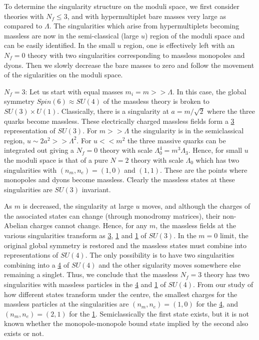 To determine the singularity structure on the moduli space, we first
consider theories with $N_f \leq 3$, and with hypermultiplet bare
masses very large as compared to $\Lambda$. The singularities which
arise from hypermultiplets becoming massless are now in the
semi-classical (large $u$) region of the moduli space and can be easily
identified. In the small $u$ region, one is effectively left with an
$N_f=0$ theory with two singularities corresponding to massless
monopoles and dyons. Then we slowly decrease the bare masses to zero
and follow the movement of the sigularities on the moduli space.

\noindent\underline{$N_f = 3$}:
Let us start with equal masses $m_i = m >> \Lambda$. In this case, the
global symmetry $Spin(6)\approx SU(4)$ of the massless theory is
broken to $SU(3) \times U(1)$. Classically, there is a singularity at
$a = m/ \sqrt{2}$ where the three quarks become massless. These
electrically charged massless fields form a \underline{3}
representation of $SU(3)$. For $m >> \Lambda$ the singularity is in
the semiclassical region, $u \sim 2a^2 >> \Lambda^2$. For $u<< m^2$
the three massive quarks can be integrated out giving a $N_f=0$ theory
with scale $\Lambda^{4}_{0} = m^3 \Lambda_3$. Hence, for small $u$ the
moduli space is that of a pure $N = 2$ theory with scale $\Lambda_{0}$
which has two singularities with $(n_m , n_e) = (1,0)$ and
$(1,1)$. These are the points where monopoles and dyons become
massless. Clearly the massless states at these singularities are
$SU(3)$ invariant. 

As $m$ is decreased, the singularity at large $u$ moves, and although
the charges of the associated states can change (through monodromy
matrices), their non-Abelian charges cannot change. Hence, for any
$m$, the massless fields at the various singularities transform as
\underline{3}, \underline{1} and \underline{1} of $SU(3)$. In the $m =
0$ limit, the original global symmetry is restored and the massless
states must combine into representations of $SU(4)$. The only
possibility is to have two singularities combining into a
\underline{4} of $SU(4)$ and the other sigularity moves somewhere else
remaining a singlet. Thus, we conclude that the massless $N_f = 3$
theory has two singularities with massless particles in the
\underline{4} and \underline{1} of $SU(4)$. From our study of how
different states transform under the centre, the smallest charges for
the massless particles at the singularities are $(n_m , n_e) = (1,0)$
for the \underline{4}, and $(n_m, n_e) = (2,1)$ for the \underline{1}.
Semiclassically the first state exists, but it is not known whether
the monopole-monopole bound state implied by the second also exists or
not.

